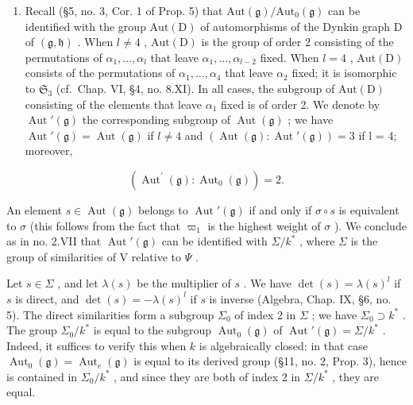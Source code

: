 \begin{enumerate}
\def\labelenumi{(\Roman{enumi})}
\setcounter{enumi}{6}
\tightlist
\item
  Recall (§5, no. 3, Cor. 1 of Prop. 5) that \(\mathrm{Aut}(\mathfrak{g}) / \mathrm{Aut}_0(\mathfrak{g})\) can be identified with the group \(\mathrm{Aut}(\mathrm{D})\) of automorphisms of the Dynkin graph D of \((\mathfrak{g},\mathfrak{h})\) . When \(l\neq 4\) , \(\mathrm{Aut}(\mathrm{D})\) is the group of order 2 consisting of the permutations of \(\alpha_{1},\ldots ,\alpha_{l}\) that leave \(\alpha_{1},\ldots ,\alpha_{l - 2}\) fixed. When \(l = 4\) , \(\mathrm{Aut}(\mathrm{D})\) consists of the permutations of \(\alpha_{1},\ldots ,\alpha_{4}\) that leave \(\alpha_{2}\) fixed; it is isomorphic to \(\mathfrak{S}_3\) (cf.~Chap. VI, §4, no. 8.XI). In all cases, the subgroup of \(\mathrm{Aut}(\mathrm{D})\) consisting of the elements that leave \(\alpha_{1}\) fixed is of order 2. We denote by \(\operatorname{Aut}'(\mathfrak{g})\) the corresponding subgroup of \(\operatorname{Aut}(\mathfrak{g})\) ; we have \(\operatorname{Aut}'(\mathfrak{g}) = \operatorname{Aut}(\mathfrak{g})\) if \(l \neq 4\) and \((\operatorname{Aut}(\mathfrak{g}) : \operatorname{Aut}'(\mathfrak{g})) = 3\) if l = 4; moreover,
\end{enumerate}

\[
\left(\operatorname{Aut} ^ {\prime} (\mathfrak {g}): \operatorname{Aut} _ {0} (\mathfrak {g})\right) = 2.
\]

An element \(s \in \operatorname{Aut}(\mathfrak{g})\) belongs to \(\operatorname{Aut}'(\mathfrak{g})\) if and only if \(\sigma \circ s\) is equivalent to \(\sigma\) (this follows from the fact that \(\varpi_{1}\) is the highest weight of \(\sigma\) ). We conclude as in no. 2.VII that \(\operatorname{Aut}'(\mathfrak{g})\) can be identified with \(\Sigma/k^{*}\) , where \(\Sigma\) is the group of similarities of V relative to \(\Psi\) .

Let \(s \in \Sigma\) , and let \(\lambda(s)\) be the multiplier of \(s\) . We have \(\det(s) = \lambda(s)^l\) if \(s\) is direct, and \(\det(s) = -\lambda(s)^l\) if \(s\) is inverse (Algebra, Chap. IX, §6, no. 5). The direct similarities form a subgroup \(\Sigma_0\) of index 2 in \(\Sigma\) ; we have \(\Sigma_0 \supset k^*\) . The group \(\Sigma_0 / k^*\) is equal to the subgroup \(\operatorname{Aut}_0(\mathfrak{g})\) of \(\operatorname{Aut}'(\mathfrak{g}) = \Sigma / k^*\) . Indeed, it suffices to verify this when \(k\) is algebraically closed: in that case \(\operatorname{Aut}_0(\mathfrak{g}) = \operatorname{Aut}_e(\mathfrak{g})\) is equal to its derived group (§11, no. 2, Prop. 3), hence is contained in \(\Sigma_0 / k^*\) , and since they are both of index 2 in \(\Sigma / k^*\) , they are equal.

